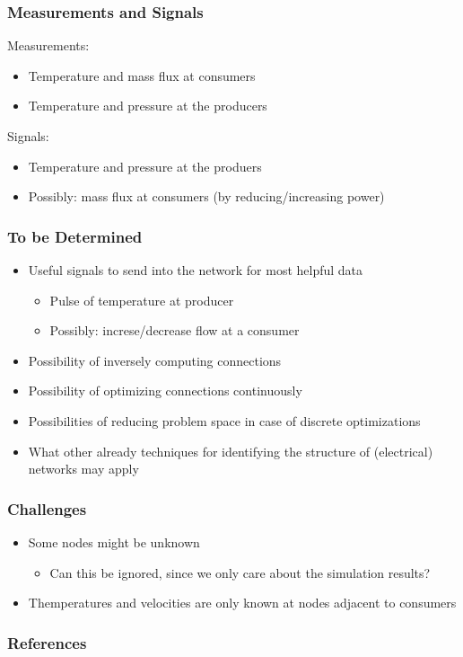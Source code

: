 \documentclass{beamer}
\begin{document}
\begin{frame}
\frametitle{Measurements and Signals}
  Measurements:
  \begin{itemize}
    \item Temperature and mass flux at consumers
    \item Temperature and pressure at the producers
  \end{itemize}

  \vspace{2em}

  Signals:
  \begin{itemize}
    \item Temperature and pressure at the produers
    \item Possibly: mass flux at consumers (by reducing/increasing power)
  \end{itemize}
\end{frame}

\begin{frame}
\frametitle{To be Determined}
  \begin{itemize}
    \item Useful signals to send into the network for most helpful data
      \begin{itemize}
        \item Pulse of temperature at producer
        \item Possibly: increse/decrease flow at a consumer
      \end{itemize}
    \item Possibility of inversely computing connections
    \item Possibility of optimizing connections continuously
    \item Possibilities of reducing problem space in case of discrete optimizations
      \vspace{1em}
    \item What other already techniques for identifying the structure of (electrical) networks may apply
  \end{itemize}
\end{frame}

\begin{frame}
\frametitle{Challenges}
  \begin{itemize}
    \item Some nodes might be unknown
      \begin{itemize}
        \item Can this be ignored, since we only care about the simulation results?
      \end{itemize}
    \item Themperatures and velocities are only known at nodes adjacent to consumers
  \end{itemize}
\end{frame}

\begin{frame}
\frametitle{References}
  
  
\end{frame}
\end{document}

